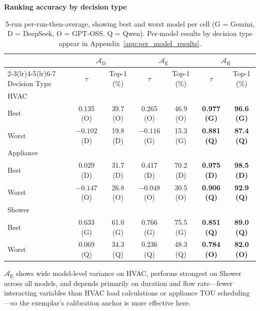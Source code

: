\documentclass[a4paper,fleqn]{cas-dc}
\begin{document}
\begin{table}[t]
\begin{threeparttable}
\footnotesize
\centering
\textbf{Ranking accuracy by decision type}
\renewcommand{\arraystretch}{1.15}
\setlength{\tabcolsep}{4pt}
\begin{tabular}{lcccccc}
\toprule
 & \multicolumn{2}{c}{$\mathcal{A}_{\text{D}}$} & \multicolumn{2}{c}{$\mathcal{A}_{\text{E}}$} & \multicolumn{2}{c}{$\mathcal{A}_{\text{H}}$} \\
\cmidrule(lr){2-3}\cmidrule(lr){4-5}\cmidrule(lr){6-7}
Decision Type & $\tau$ & Top-1 (\%) & $\tau$ & Top-1 (\%) & $\tau$ & Top-1 (\%) \\
\midrule
HVAC & & & & & & \\
\quad Best & 0.135 (O) & 39.7 (O) & 0.265 (O) & 46.9 (O) & \textbf{0.977 (G)} & \textbf{96.6 (G)} \\
\quad Worst & $-0.102$ (D) & 19.8 (D) & $-0.116$ (G) & 15.3 (G) & \textbf{0.881 (Q)} & \textbf{87.4 (Q)} \\
Appliance & & & & & & \\
\quad Best & 0.029 (D) & 31.7 (D) & 0.417 (D) & 70.2 (D) & \textbf{0.975 (D)} & \textbf{98.5 (D)} \\
\quad Worst & $-0.147$ (O) & 26.8 (O) & $-0.048$ (O) & 30.5 (O) & \textbf{0.906 (Q)} & \textbf{92.9 (Q)} \\
Shower & & & & & & \\
\quad Best & 0.633 (G) & 61.0 (G) & 0.766 (G) & 75.5 (G) & \textbf{0.851 (Q)} & \textbf{89.0 (Q)} \\
\quad Worst & 0.069 (Q) & 34.3 (Q) & 0.236 (Q) & 48.3 (Q) & \textbf{0.784 (O)} & \textbf{82.0 (O)} \\
\bottomrule
\end{tabular}
\setlength{\tabcolsep}{6pt}
\renewcommand{\arraystretch}{1.0}
\end{threeparttable}
\caption{5-run per-run-then-average, showing best and worst model per cell (G = Gemini, D = DeepSeek, O = GPT-OSS, Q = Qwen). Per-model results by decision type appear in Appendix~\ref{app:per_model_results}.}
\label{tab:item7}
\end{table}

$\mathcal{A}_{\text{E}}$ shows wide model-level variance on HVAC, performs strongest on Shower across all models, and depends primarily on duration and flow rate---fewer interacting variables than HVAC load calculations or appliance TOU scheduling---so the exemplar's calibration anchor is more effective here.
\end{document}
